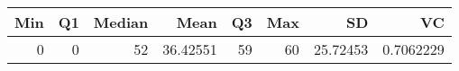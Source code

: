 
\begin{tabular}[t]{rrrrrrrr}
\toprule
Min & Q1 & Median & Mean & Q3 & Max & SD & VC\\
\midrule
0 & 0 & 52 & 36.42551 & 59 & 60 & 25.72453 & 0.7062229\\
\bottomrule
\end{tabular}